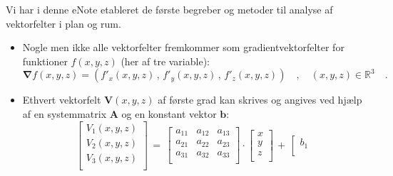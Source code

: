 
\begin{summary}
Vi har i denne eNote etableret de første begreber og metoder til analyse af vektorfelter i plan og rum.
\begin{itemize}
\item Nogle men ikke alle vektorfelter fremkommer som gradientvektorfelter for funktioner $f(x,y,z)$ (her af tre variable):
\begin{equation}
\bm{\nabla}f(x,y,z) = \left(f'_{x}(x,y,z)\, , \, f'_{y}(x,y,z) \, , \, f'_{z}(x,y,z)\right) \quad , \quad (x,y,z) \in \mathbb{R}^{3} \quad .
\end{equation}
\item Ethvert vektorfelt $\mathbf{V}(x,y,z)$ af første grad kan skrives og angives ved hjælp af en systemmatrix $\mathbf{A}$ og en konstant vektor $\mathbf{b}$:
\begin{equation}
\left[
  \begin{array}{c}
    V_{1}(x,y,z) \\
    V_{2}(x,y,z) \\
    V_{3}(x,y,z) \\
  \end{array}\right] \, = \, \left[
                        \begin{array}{ccc}
                          a_{11} & a_{12} & a_{13} \\
                          a_{21} & a_{22} & a_{23} \\
                          a_{31} & a_{32} & a_{33} \\
                        \end{array}\right]\cdot \left[
                                        \begin{array}{c}
                                          x \\
                                          y \\
                                          z \\
                                        \end{array}
                                      \right] \, + \, \left[
                                                        \begin{array}{c}
                                                          b_{1} \\

\end{array}
\end{equation}
\end{itemize}
\end{summary}
